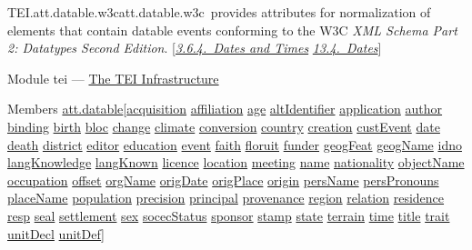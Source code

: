 \begin{reflist}
\item[]\begin{specHead}{TEI.att.datable.w3c}{att.datable.w3c} provides attributes for normalization of elements that contain datable events conforming to the W3C \textit{XML Schema Part 2: Datatypes Second Edition}. [\textit{\hyperref[CONADA]{3.6.4.\ Dates and Times}} \textit{\hyperref[NDDATE]{13.4.\ Dates}}]\end{specHead} 
    \item[{Module}]
  tei — \hyperref[ST]{The TEI Infrastructure}
    \item[{Members}]
  \hyperref[TEI.att.datable]{att.datable}[\hyperref[TEI.acquisition]{acquisition} \hyperref[TEI.affiliation]{affiliation} \hyperref[TEI.age]{age} \hyperref[TEI.altIdentifier]{altIdentifier} \hyperref[TEI.application]{application} \hyperref[TEI.author]{author} \hyperref[TEI.binding]{binding} \hyperref[TEI.birth]{birth} \hyperref[TEI.bloc]{bloc} \hyperref[TEI.change]{change} \hyperref[TEI.climate]{climate} \hyperref[TEI.conversion]{conversion} \hyperref[TEI.country]{country} \hyperref[TEI.creation]{creation} \hyperref[TEI.custEvent]{custEvent} \hyperref[TEI.date]{date} \hyperref[TEI.death]{death} \hyperref[TEI.district]{district} \hyperref[TEI.editor]{editor} \hyperref[TEI.education]{education} \hyperref[TEI.event]{event} \hyperref[TEI.faith]{faith} \hyperref[TEI.floruit]{floruit} \hyperref[TEI.funder]{funder} \hyperref[TEI.geogFeat]{geogFeat} \hyperref[TEI.geogName]{geogName} \hyperref[TEI.idno]{idno} \hyperref[TEI.langKnowledge]{langKnowledge} \hyperref[TEI.langKnown]{langKnown} \hyperref[TEI.licence]{licence} \hyperref[TEI.location]{location} \hyperref[TEI.meeting]{meeting} \hyperref[TEI.name]{name} \hyperref[TEI.nationality]{nationality} \hyperref[TEI.objectName]{objectName} \hyperref[TEI.occupation]{occupation} \hyperref[TEI.offset]{offset} \hyperref[TEI.orgName]{orgName} \hyperref[TEI.origDate]{origDate} \hyperref[TEI.origPlace]{origPlace} \hyperref[TEI.origin]{origin} \hyperref[TEI.persName]{persName} \hyperref[TEI.persPronouns]{persPronouns} \hyperref[TEI.placeName]{placeName} \hyperref[TEI.population]{population} \hyperref[TEI.precision]{precision} \hyperref[TEI.principal]{principal} \hyperref[TEI.provenance]{provenance} \hyperref[TEI.region]{region} \hyperref[TEI.relation]{relation} \hyperref[TEI.residence]{residence} \hyperref[TEI.resp]{resp} \hyperref[TEI.seal]{seal} \hyperref[TEI.settlement]{settlement} \hyperref[TEI.sex]{sex} \hyperref[TEI.socecStatus]{socecStatus} \hyperref[TEI.sponsor]{sponsor} \hyperref[TEI.stamp]{stamp} \hyperref[TEI.state]{state} \hyperref[TEI.terrain]{terrain} \hyperref[TEI.time]{time} \hyperref[TEI.title]{title} \hyperref[TEI.trait]{trait} \hyperref[TEI.unitDecl]{unitDecl} \hyperref[TEI.unitDef]{unitDef}]

\end{reflist}
